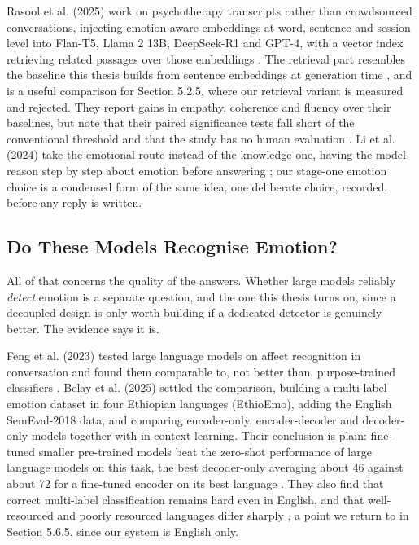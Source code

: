 Rasool et al. (2025) work on psychotherapy transcripts rather than crowdsourced conversations, injecting emotion-aware embeddings at word, sentence and session level into Flan-T5, Llama 2 13B, DeepSeek-R1 and GPT-4, with a vector index retrieving related passages over those embeddings \cite{rasool2025}. The retrieval part resembles the baseline this thesis builds from sentence embeddings at generation time \cite{reimers2019sbert,lewis2020rag}, and is a useful comparison for Section 5.2.5, where our retrieval variant is measured and rejected. They report gains in empathy, coherence and fluency over their baselines, but note that their paired significance tests fall short of the conventional threshold and that the study has no human evaluation \cite{rasool2025}. Li et al. (2024) take the emotional route instead of the knowledge one, having the model reason step by step about emotion before answering \cite{li2024emotioncot}; our stage-one emotion choice is a condensed form of the same idea, one deliberate choice, recorded, before any reply is written.

\subsection{Do These Models Recognise Emotion?}
\label{sec:2.2.5}

All of that concerns the quality of the answers. Whether large models reliably \textit{detect }emotion is a separate question, and the one this thesis turns on, since a decoupled design is only worth building if a dedicated detector is genuinely better. The evidence says it is.

Feng et al. (2023) tested large language models on affect recognition in conversation and found them comparable to, not better than, purpose-trained classifiers \cite{feng2023affect}. Belay et al. (2025) settled the comparison, building a multi-label emotion dataset in four Ethiopian languages (EthioEmo), adding the English SemEval-2018 data, and comparing encoder-only, encoder-decoder and decoder-only models together with in-context learning. Their conclusion is plain: fine-tuned smaller pre-trained models beat the zero-shot performance of large language models on this task, the best decoder-only averaging about 46 against about 72 for a fine-tuned encoder on its best language \cite{belay2025}. They also find that correct multi-label classification remains hard even in English, and that well-resourced and poorly resourced languages differ sharply \cite{belay2025}, a point we return to in Section 5.6.5, since our system is English only.

